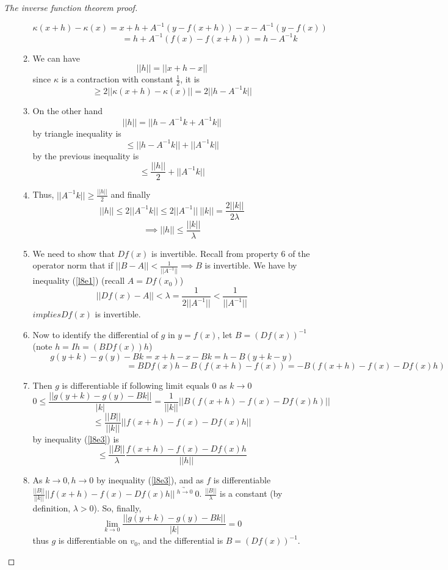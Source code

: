\begin{proof}[The inverse function theorem proof]
\begin{enumerate}[I]
\begin{enumerate}
      $$\kappa(x+h) - \kappa(x) = x + h + A^{-1}(y-f(x+h))-x-A^{-1}(y-f(x))$$
      $$\phantom{\kappa(x+h) - \kappa(x)} =h+A^{-1}(f(x)-f(x+h))=h-A^{-1}k$$
    \item We can have
      $$||h|| = ||x + h - x||$$
      since $\kappa$ is a contraction with constant $\frac{1}{2}$, it is
      $$\geq 2||\kappa(x+h)-\kappa(x)|| = 2||h-A^{-1}k||$$
    \item On the other hand
      $$||h|| = ||h-A^{-1}k + A^{-1}k||$$
      by triangle inequality is
      $$\leq ||h-A^{-1}k|| + ||A^{-1}k||$$
      by the previous inequality is
      $$\leq \frac{||h||}{2}+||A^{-1}k||$$
    \item Thus, $||A^{-1}k|| \geq \frac{||h||}{2}$ and finally
      $$||h|| \leq 2||A^{-1}k|| \leq 2||A^{-1}||\ ||k|| = \frac{2||k||}{2\lambda}$$
      \begin{equation}
        \label{l8e3}
        \implies ||h|| \leq \frac{||k||}{\lambda}
      \end{equation}
    \item We need to show that $Df(x)$ is invertible. Recall from property 6 of the operator norm that if $||B - A|| < \frac{1}{||A^{-1}||} \implies B$ is invertible. We have by inequality (\ref{l8e1}) (recall $A = Df(x_0)$)
      $$||Df(x) - A|| < \lambda = \frac{1}{2||A^{-1}||} < \frac{1}{||A^{-1}||}$$
      $implies Df(x)$ is invertible.
    \item Now to identify the differential of $g$ in $y=f(x)$, let $B=(Df(x))^{-1}$ (note $h = Ih = (BDf(x))h$)
      $$g(y+k) - g(y) - Bk = x+h-x-Bk = h-B(y+k-y)$$
      $$\phantom{g(y+k) - g(y) - Bk}= BDf(x)h - B(f(x+h) - f(x)) = -B(f(x+h)-f(x)-Df(x)h)$$
    \item Then $g$ is differentiable if following limit equals $0$ as $k \rightarrow 0$
      $$0 \leq \frac{||g(y+k) - g(y) - Bk||}{|k|} = \frac{1}{||k||}||B(f(x+h)-f(x)-Df(x)h)|| $$
      $$\leq \frac{||B||}{||k||}||f(x+h)-f(x)-Df(x)h||$$
      by inequality (\ref{l8e3}) is
      $$\leq \frac{||B||}{\lambda}\frac{f(x+h)-f(x)-Df(x)h}{||h||}$$
    \item As $k\rightarrow 0, h\rightarrow 0$ by inequality (\ref{l8e3}), and as $f$ is differentiable $\frac{||B||}{||k||}||f(x+h)-f(x)-Df(x)h||\ \underrightarrow{^{h\rightarrow 0}}\ 0$. $\frac{||B||}{\lambda}$ is a constant (by definition, $\lambda > 0$).
      So, finally,
      $$\lim_{k\rightarrow 0}\frac{||g(y+k) - g(y) - Bk||}{|k|} = 0$$
      thus $g$ is differentiable on $v_0$, and the differential is $B = (Df(x))^{-1}$.
    \end{enumerate}
  \end{enumerate}
\end{proof}

